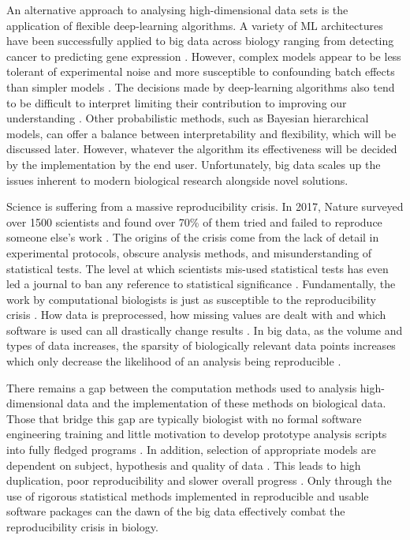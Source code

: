 \documentclass[../main.tex]{subfiles}
\begin{document}
An alternative approach to analysing high-dimensional data sets is the application of flexible deep-learning algorithms.
A variety of ML architectures have been successfully applied to big data across biology ranging from detecting cancer to predicting gene expression \parencite{Xie2017, Liang2015, Tang2019}.
However, complex models appear to be less tolerant of experimental noise and more susceptible to confounding batch effects than simpler models \parencite{Cortes2015, Kaiser2019, Schmitt2021}.
The decisions made by deep-learning algorithms also tend to be difficult to interpret limiting their contribution to improving our understanding \parencite{Caruana2015, Ribeiro2016}.
Other probabilistic methods, such as Bayesian hierarchical models, can offer a balance between interpretability and flexibility, which will be discussed later.
However, whatever the algorithm its effectiveness will be decided by the implementation by the end user. 
Unfortunately, big data scales up the issues inherent to modern biological research alongside novel solutions. 

Science is suffering from a massive reproducibility crisis. 
In 2017, Nature surveyed over 1500 scientists and found over 70\% of them tried and failed to reproduce someone else's work \parencite{Baker2016}.
The origins of the crisis come from the lack of detail in experimental protocols, obscure analysis methods, and misunderstanding of statistical tests.
The level at which scientists mis-used statistical tests has even led a journal to ban any reference to statistical significance \parencite{Trafimow2015}.
Fundamentally, the work by computational biologists is just as susceptible to the reproducibility crisis \parencite{Garijo2013}.
How data is preprocessed, how missing values are dealt with and which software is used can all drastically change results \parencite{Ioannidis2009}.
In big data, as the volume and types of data increases, the sparsity of biologically relevant data points increases which only decrease the likelihood of an analysis being reproducible \parencite{Chattopadhyay2019}.

There remains a gap between the computation methods used to analysis high-dimensional data and the implementation of these methods on biological data.
Those that bridge this gap are typically biologist with no formal software engineering training \parencite{Attwood2019} and little motivation to develop prototype analysis scripts into fully fledged programs \parencite{Prins2015}. 
In addition, selection of appropriate models are dependent on subject, hypothesis and quality of data \parencite{Ching2018}.
This leads to high duplication, poor reproducibility and slower overall progress \parencite{Lawlor2015}.
Only through the use of rigorous statistical methods implemented in reproducible and usable software packages can the dawn of the big data effectively combat the reproducibility crisis in biology.
\end{document}
